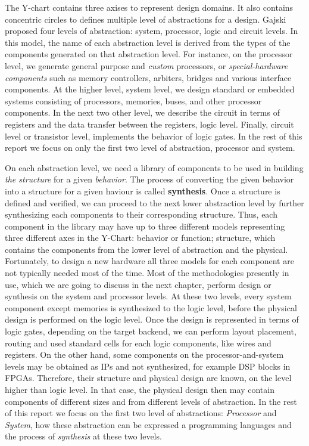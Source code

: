 The Y-chart contains three axises to represent design domains.
It also contains concentric circles to defines multiple level of abstractions for a design.
Gajski~\cite{gajski_1992_high} proposed four levels of abstraction: system, processor, logic and circuit levels.
In this model, the name of each abstraction level is derived from the types of the components generated on that abstraction level.
For instance, on the processor level, we generate general purpose and \emph{custom} processors, or \emph{special-hardware components} such as memory controllers, arbiters, bridges and various interface components.
At the higher level, system level, we design standard or embedded systems consisting of processors, memories, buses, and other processor components.
In the next two other level, we describe the circuit in terms of registers and the data transfer between the registers, logic level. Finally, circuit level or transistor level, implements the behavior of logic gates.
In the rest of this report we focus on only the first two level of abstraction, processor and system.

On each abstraction level, we need a library of components to be used in building \emph{the structure} for a given \emph{behavior}.
The process of converting the given behavior into a structure for a given haviour is called \textbf{synthesis}.
Once a structure is defined and verified, we can proceed to the next lower abstraction level by further synthesizing each components to their corresponding structure.
Thus, each component in the library may have up to three different models representing three different axes in the Y-Chart: behavior or function; structure, which contains the components from the lower level of abstraction and the physical.
Fortunately, to design a new hardware all three models for each component are not typically needed most of the time.
Most of the methodologies presently in use, which we are going to discuss in the next chapter, perform design or synthesis on the system and processor levels.
At these two levels, every system component except memories is synthesized to the logic level, before the physical design is performed on the logic level.
Once the design is represented in terms of logic gates, depending on the target backend, we can perform layout placement, routing and used standard cells for each logic components, like wires and registers.
On the other hand, some components on the processor-and-system levels may be obtained as IPs and not synthesized, for example DSP blocks in FPGAs.
Therefore, their structure and physical design are known, on the level higher than logic level.
In that case, the physical design then may contain components of different sizes and from different levels of abstraction.
In the rest of this report we focus on the first two level of abstractions: \textit{Processor} and \textit{System}, how these abstraction can be expressed a programming languages and the process of \emph{synthesis} at these two levels.


